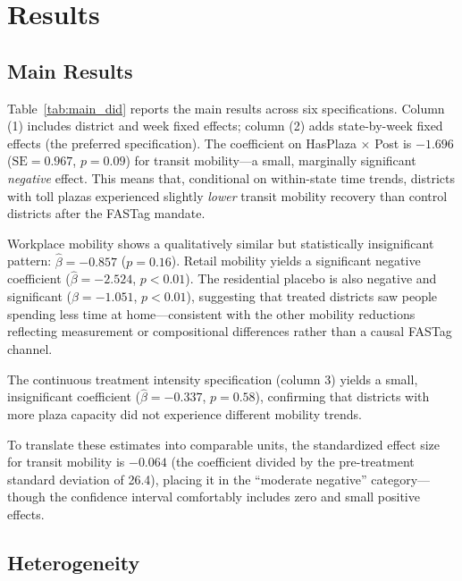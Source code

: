 \documentclass[12pt]{article}
\begin{document}
\section{Results}

\subsection{Main Results}



Table~\ref{tab:main_did} reports the main results across six specifications. Column (1) includes district and week fixed effects; column (2) adds state-by-week fixed effects (the preferred specification). The coefficient on HasPlaza $\times$ Post is $-1.696$ ($\text{SE} = 0.967$, $p = 0.09$) for transit mobility---a small, marginally significant \textit{negative} effect. This means that, conditional on within-state time trends, districts with toll plazas experienced slightly \textit{lower} transit mobility recovery than control districts after the FASTag mandate.

Workplace mobility shows a qualitatively similar but statistically insignificant pattern: $\hat{\beta} = -0.857$ ($p = 0.16$). Retail mobility yields a significant negative coefficient ($\hat{\beta} = -2.524$, $p < 0.01$). The residential placebo is also negative and significant ($\hat{\beta} = -1.051$, $p < 0.01$), suggesting that treated districts saw people spending less time at home---consistent with the other mobility reductions reflecting measurement or compositional differences rather than a causal FASTag channel.

The continuous treatment intensity specification (column 3) yields a small, insignificant coefficient ($\hat{\beta} = -0.337$, $p = 0.58$), confirming that districts with more plaza capacity did not experience different mobility trends.

To translate these estimates into comparable units, the standardized effect size for transit mobility is $-0.064$ (the coefficient divided by the pre-treatment standard deviation of 26.4), placing it in the ``moderate negative'' category---though the confidence interval comfortably includes zero and small positive effects.

\subsection{Heterogeneity}


\end{document}
